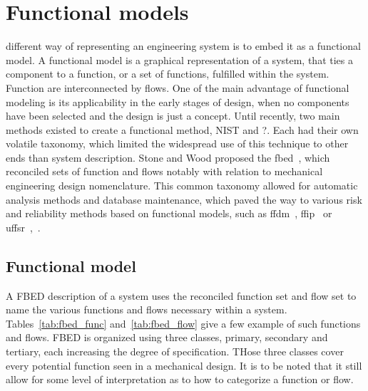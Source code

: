 %
%
\let\textcircled=\pgftextcircled
\chapter{Functional models}
\label{chap:fm}


 different way of representing an engineering system is to embed it as a functional model. A functional model is a graphical representation of a system, that ties a component to a function, or a set of functions, fulfilled within the system. Function are interconnected by flows. One of the main advantage of functional modeling is its applicability in the early stages of design, when no components have been selected and the design is just a concept. Until recently, two main methods existed to create a functional method, NIST and ?. Each had their own volatile taxonomy, which limited the widespread use of this technique to other ends than system description. Stone and Wood proposed the \gls{fbed}~\cite{stone}, which reconciled sets of function and flows notably with relation to mechanical engineering design nomenclature. This common taxonomy allowed for automatic analysis methods and database maintenance, which paved the way to various risk and reliability methods based on functional models, such as \gls{ffdm}~\cite{stone2005}, \gls{ffip}~\cite{kurtoglu2007} or \gls{uffsr}~\cite{vanbossuyt2014},~\cite{ohalloran2015}.


\section{Functional model}

A FBED description of a system uses the reconciled function set and flow set to name the various functions and flows necessary within a system. Tables~\ref{tab:fbed_func} and~\ref{tab:fbed_flow} give a few example of such functions and flows. FBED is organized using three classes, primary, secondary and tertiary, each increasing the degree of specification. THose three classes cover every potential function seen in a mechanical design. It is to be noted that it still allow for some level of interpretation as to how to categorize a function or flow.

